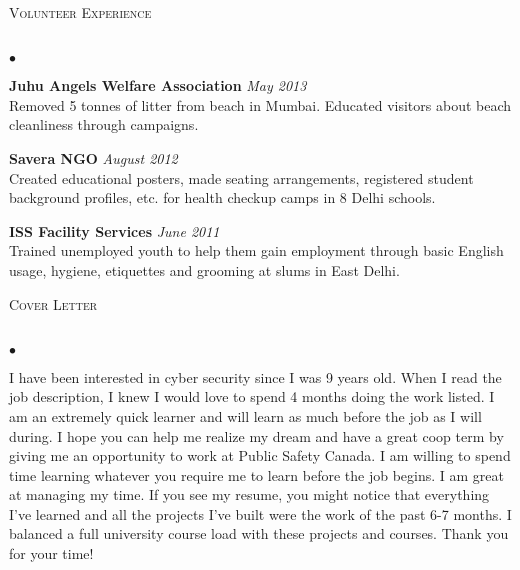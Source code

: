 \documentclass[10pt]{article}
\newcommand{\lineunder}{\vspace*{-8pt} \\ \hspace*{-18pt} \hrulefill \\}
\newcommand{\header}[1]{{\hspace*{-15pt}\vspace*{6pt} \textsc{#1}} \vspace*{-6pt} \lineunder}
\newenvironment{achievements}{\begin{list}{$\bullet$}{\topsep 0pt \itemsep -1.5pt \leftmargin 5pt}}{\vspace*{4pt}\end{list}}
\begin{document}
\header{\normalsize Volunteer Experience}
\begin{achievements}
\item \textbf{Juhu Angels Welfare Association}   \hfill \textit{May 2013}
\\ Removed 5 tonnes of litter from beach in Mumbai. Educated visitors about beach cleanliness through campaigns.
\item \textbf{Savera NGO}     \hfill \textit{August 2012}
\\ Created educational posters, made seating arrangements, registered student background profiles, etc. for health checkup camps in 8 Delhi schools.
\item \textbf{ISS Facility Services}    \hfill \textit{June 2011}
\\ Trained unemployed youth to help them gain employment through basic English usage, hygiene, etiquettes and grooming at slums in East Delhi.
\end{achievements}

\vspace{5pt}

\header{\normalsize Cover Letter}
\begin{achievements}
\item
I have been interested in cyber security since I was 9 years old. When I read the job description, I knew I would love to spend 4 months doing the work listed. I am an extremely quick learner and will learn as much before the job as I will during. I hope you can help me realize my dream and have a great coop term by giving me an opportunity to work at Public Safety Canada. I am willing to spend time learning whatever you require me to learn before the job begins. I am great at managing my time. If you see my resume, you might notice that everything I've learned and all the projects I've built were the work of the past 6-7 months. I balanced a full university course load with these projects and courses. Thank you for your time!
\end{achievements}
\end{document}
